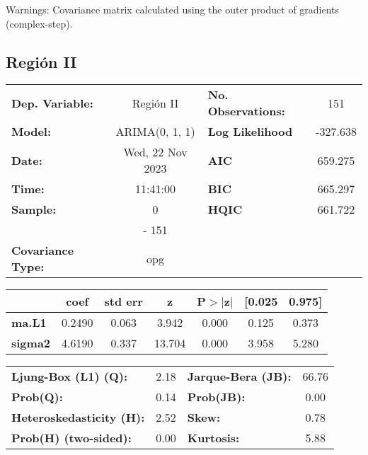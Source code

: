 \documentclass{article}%
\begin{document}
Warnings: \newline
 [1] Covariance matrix calculated using the outer product of gradients (complex-step).%
\subsection*{Región II}%
\begin{center}
\begin{tabular}{lclc}
\toprule
\textbf{Dep. Variable:}          &    Región II     & \textbf{  No. Observations:  } &    151      \\
\textbf{Model:}                  &  ARIMA(0, 1, 1)  & \textbf{  Log Likelihood     } &  -327.638   \\
\textbf{Date:}                   & Wed, 22 Nov 2023 & \textbf{  AIC                } &  659.275    \\
\textbf{Time:}                   &     11:41:00     & \textbf{  BIC                } &  665.297    \\
\textbf{Sample:}                 &        0         & \textbf{  HQIC               } &  661.722    \\
\textbf{}                        &       - 151      & \textbf{                     } &             \\
\textbf{Covariance Type:}        &       opg        & \textbf{                     } &             \\
\bottomrule
\end{tabular}
\begin{tabular}{lcccccc}
                & \textbf{coef} & \textbf{std err} & \textbf{z} & \textbf{P$> |$z$|$} & \textbf{[0.025} & \textbf{0.975]}  \\
\midrule
\textbf{ma.L1}  &       0.2490  &        0.063     &     3.942  &         0.000        &        0.125    &        0.373     \\
\textbf{sigma2} &       4.6190  &        0.337     &    13.704  &         0.000        &        3.958    &        5.280     \\
\bottomrule
\end{tabular}
\begin{tabular}{lclc}
\textbf{Ljung-Box (L1) (Q):}     & 2.18 & \textbf{  Jarque-Bera (JB):  } & 66.76  \\
\textbf{Prob(Q):}                & 0.14 & \textbf{  Prob(JB):          } &  0.00  \\
\textbf{Heteroskedasticity (H):} & 2.52 & \textbf{  Skew:              } &  0.78  \\
\textbf{Prob(H) (two-sided):}    & 0.00 & \textbf{  Kurtosis:          } &  5.88  \\
\bottomrule
\end{tabular}
\end{center}
\end{document}
